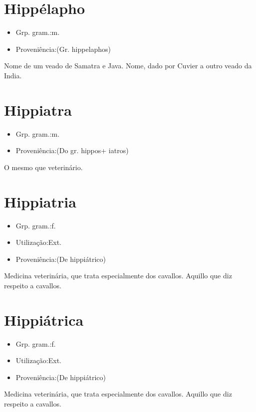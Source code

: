 \documentclass{article}
\begin{document}
\section{Hippélapho}
\begin{itemize}
\item {Grp. gram.:m.}
\end{itemize}
\begin{itemize}
\item {Proveniência:(Gr. \textunderscore hippelaphos\textunderscore )}
\end{itemize}
Nome de um veado de Samatra e Java.
Nome, dado por Cuvier a outro veado da India.
\section{Hippiatra}
\begin{itemize}
\item {Grp. gram.:m.}
\end{itemize}
\begin{itemize}
\item {Proveniência:(Do gr. \textunderscore hippos\textunderscore  + \textunderscore iatros\textunderscore )}
\end{itemize}
O mesmo que \textunderscore veterinário\textunderscore .
\section{Hippiatria}
\begin{itemize}
\item {Grp. gram.:f.}
\end{itemize}
\begin{itemize}
\item {Utilização:Ext.}
\end{itemize}
\begin{itemize}
\item {Proveniência:(De \textunderscore hippiátrico\textunderscore )}
\end{itemize}
Medicina veterinária, que trata especialmente dos cavallos.
Aquillo que diz respeito a cavallos.
\section{Hippiátrica}
\begin{itemize}
\item {Grp. gram.:f.}
\end{itemize}
\begin{itemize}
\item {Utilização:Ext.}
\end{itemize}
\begin{itemize}
\item {Proveniência:(De \textunderscore hippiátrico\textunderscore )}
\end{itemize}
Medicina veterinária, que trata especialmente dos cavallos.
Aquillo que diz respeito a cavallos.
\end{document}
